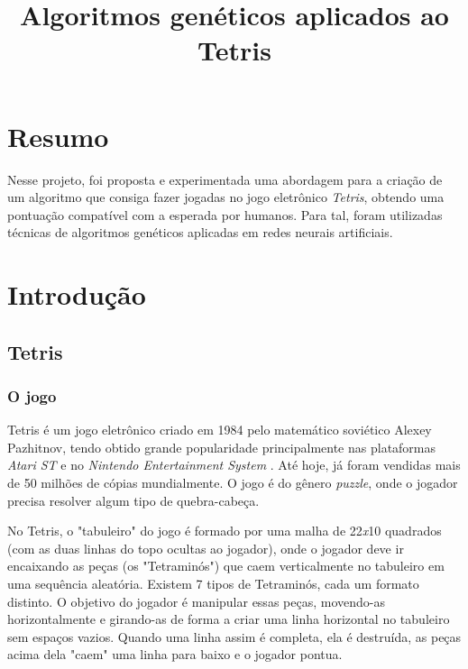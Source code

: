 \documentclass[conference]{IEEEtran}
\begin{document}
\title{Algoritmos genéticos aplicados ao Tetris}

\author{
\and
{}
\and
{}
\and
{}
}


\maketitle

\section{Resumo}
Nesse projeto, foi proposta e experimentada uma abordagem para a criação de um algoritmo que consiga fazer jogadas no jogo eletrônico \textit{Tetris}, obtendo uma pontuação compatível com a esperada por humanos. Para tal, foram utilizadas técnicas de algoritmos genéticos aplicadas em redes neurais artificiais.

\section{Introdução}

\subsection{Tetris}
\subsubsection{O jogo}
Tetris é um jogo eletrônico criado em 1984 pelo matemático soviético Alexey Pazhitnov, tendo obtido grande popularidade principalmente nas plataformas \textit{Atari  ST} e no \textit{Nintendo Entertainment System} \cite{b1}. Até hoje, já foram vendidas mais de 50 milhões de cópias mundialmente. O jogo é do gênero \textit{puzzle}, onde o jogador precisa resolver algum tipo de quebra-cabeça.

No Tetris, o "tabuleiro" do jogo é formado por uma malha de 22\textit{x}10 quadrados (com as duas linhas do topo ocultas ao jogador), onde o jogador deve ir encaixando as peças (os "Tetraminós") que caem verticalmente no tabuleiro em uma sequência aleatória. Existem 7 tipos de Tetraminós, cada um formato distinto. O objetivo do jogador é manipular essas peças, movendo-as horizontalmente e girando-as de forma a criar uma linha horizontal no tabuleiro sem espaços vazios. Quando uma linha assim é completa, ela é destruída, as peças acima dela "caem" uma linha para baixo e o jogador pontua.
\end{document}

